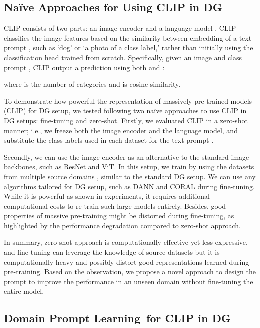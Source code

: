 \documentclass[letterpaper]{article} \usepackage[]{aaai23}
\newcommand{\dpllong}{Domain Prompt Learning}
\begin{document}
\subsection{Na\"{i}ve Approaches for Using CLIP in DG}
CLIP consists of two parts: an image encoder  and a language model . 
CLIP classifies the image features based on the similarity between embedding of a text prompt , such as `dog' or `a photo of a {class label},' rather than initially using the classification head trained from scratch. 
Specifically, given an image  and  class prompt , CLIP output a prediction using both  and :

where  is the number of categories and  is cosine similarity.

To demonstrate how powerful the representation of massively pre-trained models (CLIP) for DG setup, we tested following two na\"{i}ve approaches to use CLIP in DG setups: fine-tuning and zero-shot.
Firstly, we evaluated CLIP in a zero-shot manner; i.e., we freeze both the image encoder and the language model, and substitute the class labels used in each dataset for the text prompt . 

Secondly, we can use the image encoder  as an alternative to the standard image backbones, such as ResNet and ViT. 
In this setup, we train  by using the datasets  from multiple source domains , similar to the standard DG setup. 
We can use any algorithms tailored for DG setup, such as DANN and CORAL during fine-tuning. 
While it is powerful as shown in experiments, it requires additional computational costs to re-train such large models entirely. 
Besides, good properties of massive pre-training might be distorted during fine-tuning, as highlighted by the performance degradation compared to zero-shot approach. 

In summary, zero-shot approach is computationally effective yet less expressive, and fine-tuning can leverage the knowledge of source datasets but it is computationally heavy and possibly distort good representations learned during pre-training. 
Based on the observation, we propose a novel approach to design the prompt  to improve the performance in an unseen domain without fine-tuning the entire model. 

\subsection{\dpllong~for CLIP in DG}
\end{document}
